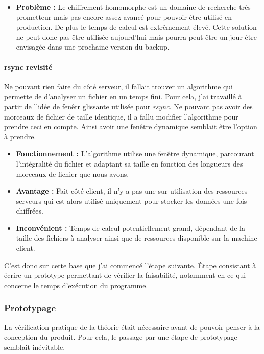 \documentclass[a4paper,10pt, twoside]{report}
\begin{document}
\begin{spacing}{1.2}
\begin{itemize}
 \item \textbf{Probl\`eme :} Le chiffrement homomorphe est un domaine de
 recherche tr\`es prometteur mais pas encore assez avanc\'e pour pouvoir
 \^etre utilis\'e en production. De plus le temps de calcul est extr\^emement
 \'elev\'e. Cette solution ne peut donc pas \^etre utilis\'ee aujourd'hui mais
 pourra peut-\^etre un jour \^etre envisag\'ee dans une prochaine version du
backup.
\end{itemize}

\paragraph{rsync revisit\'e}
Ne pouvant rien faire du c\^ot\'e serveur, il fallait trouver un algorithme
qui permette de d'analyser un fichier en un temps fini. Pour cela, j'ai
travaill\'e \`a partir de l'id\'ee de fen\^etr glissante utilis\'ee pour
\textit{rsync}. Ne pouvant pas avoir des morceaux de fichier de taille
identique, il a fallu modifier l'algorithme pour prendre ceci en compte. Ainsi
avoir une fen\^etre dynamique semblait \^etre l'option \`a prendre.

\begin{itemize}
 \item \textbf{Fonctionnement :} L'algorithme utilise une fen\^etre dynamique,
 parcourant l'int\'egralit\'e du fichier et adaptant sa taille en fonction
 des longueurs des morceaux de fichier que nous avons.
 
 \item \textbf{Avantage :} Fait c\^ot\'e client, il n'y a pas une
 sur-utilisation des ressources serveurs qui est alors utilis\'e uniquement
 pour stocker les donn\'ees une fois chiffr\'ees.
 
 \item \textbf{Inconv\'enient :} Temps de calcul potentiellement grand,
 d\'ependant de la taille des fichiers \`a analyser ainsi que de ressources
 disponible sur la machine client.
\end{itemize}

C'est donc sur cette base que j'ai commenc\'e l'\'etape suivante. \'Etape 
consistant \`a \'ecrire un prototype permettant de v\'erifier la faisabilit\'e,
notamment en ce qui concerne le temps d'ex\'ecution du programme.

\subsubsection{Prototypage}
La v\'erification pratique de la th\'eorie \'etait n\'ecessaire avant de
pouvoir penser \`a la conception du produit. Pour cela, le passage par une
\'etape de prototypage semblait in\'evitable.


\end{spacing}
\end{document}
